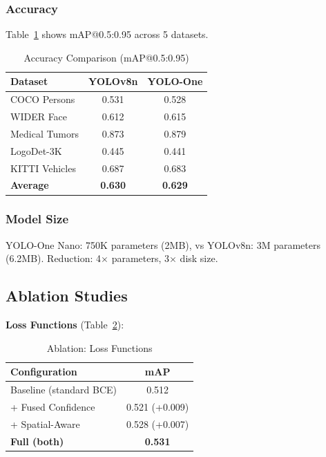 \documentclass[conference]{IEEEtran}
\begin{document}
\subsubsection{Accuracy}

Table~\ref{tab:accuracy} shows mAP@0.5:0.95 across 5 datasets.

\begin{table}[t]
\centering
\caption{Accuracy Comparison (mAP@0.5:0.95)}
\label{tab:accuracy}
\begin{tabular}{@{}lcc@{}}
\toprule
\textbf{Dataset} & \textbf{YOLOv8n} & \textbf{YOLO-One} \\ \midrule
COCO Persons     & 0.531            & 0.528             \\
WIDER Face       & 0.612            & 0.615             \\
Medical Tumors   & 0.873            & 0.879             \\
LogoDet-3K       & 0.445            & 0.441             \\
KITTI Vehicles   & 0.687            & 0.683             \\ \midrule
\textbf{Average} & \textbf{0.630}   & \textbf{0.629}    \\
\bottomrule
\end{tabular}
\end{table}

\subsubsection{Model Size}

YOLO-One Nano: 750K parameters (2MB), vs YOLOv8n: 3M parameters (6.2MB). Reduction: 4$\times$ parameters, 3$\times$ disk size.

\subsection{Ablation Studies}

\textbf{Loss Functions} (Table~\ref{tab:ablation_loss}):

\begin{table}[h]
\centering
\caption{Ablation: Loss Functions}
\label{tab:ablation_loss}
\begin{tabular}{@{}lc@{}}
\toprule
\textbf{Configuration} & \textbf{mAP} \\ \midrule
Baseline (standard BCE) & 0.512 \\
+ Fused Confidence      & 0.521 (+0.009) \\
+ Spatial-Aware         & 0.528 (+0.007) \\
\textbf{Full (both)}    & \textbf{0.531} \\ \bottomrule
\end{tabular}
\end{table}
\end{document}

